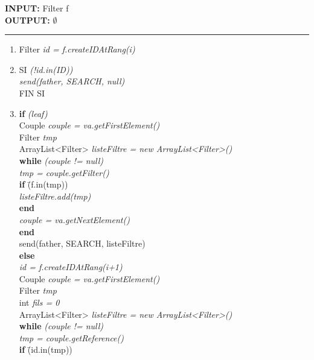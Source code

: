 \documentclass[a4paper,11pt]{report}
\begin{document}
\begin{flushleft}
	\begin{framed}
		\textbf{INPUT:} Filter f\\
		\textbf{OUTPUT:} $\emptyset$
		\noindent\rule{\linewidth}{0.5pt}

		\begin{enumerate}
			\item Filter \textit{id = f.createIDAtRang(i)}
			\item
			\begin{tabbing}
				SI \= \textit{(!id.in(ID))}\\
					\> \textit{send(father, SEARCH, null)}\\
				FIN SI
			\end{tabbing}
			\item 
			\begin{tabbing}
				\textbf{if} \= \textit{(leaf)}\\
					\> Couple \textit{couple = va.getFirstElement()}\\
					\> Filter \textit{tmp}\\
					\> ArrayList<Filter> \textit{listeFiltre = new ArrayList<Filter>()}\\
					\> \textbf{while} \= \textit{(couple != null)}\\
					\> \> \textit{tmp = couple.getFilter()}\\
					\> \> \textbf{if} \= (f.in(tmp)) \\
					\> \> \> \textit{listeFiltre.add(tmp)}\\
					\> \> \textbf{end}\\
					\> \> \textit{couple = va.getNextElement()}\\
					\> \textbf{end}\\ 
					\> send(father, SEARCH, listeFiltre)\\
				\textbf{else}\\
					\> \textit{id = f.createIDAtRang(i+1)}\\
					\> Couple \textit{couple = va.getFirstElement()}\\
					\> Filter \textit{tmp}\\
					\> int \textit{fils = 0}\\
					\> ArrayList<Filter> \textit{listeFiltre = new ArrayList<Filter>()}\\
					\> \textbf{while} \= \textit{(couple != null)}\\
					\> \> \textit{tmp = couple.getReference()}\\
					\> \> \textbf{if} \= (id.in(tmp)) \\

\end{tabbing}
\end{enumerate}
\end{framed}
\end{flushleft}
\end{document}
